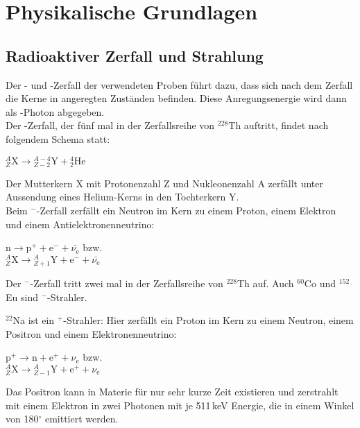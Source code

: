 \section{Physikalische Grundlagen}
\subsection{Radioaktiver Zerfall und Strahlung}

Der \textalpha- und \textbeta-Zerfall der verwendeten Proben führt dazu,
dass sich nach dem Zerfall die Kerne in angeregten Zuständen befinden.
Diese Anregungsenergie wird dann als \textgamma-Photon abgegeben.\\

Der \textalpha-Zerfall, der fünf mal in der Zerfallsreihe von ${}^{228}$Th auftritt,
findet nach folgendem Schema statt:
\begin{center}
${}^{A}_{Z}\text{X} \rightarrow {}^{A-4}_{Z-2}\text{Y} + {}^{4}_{2}\text{He}$
\end{center}
Der Mutterkern X mit Protonenzahl Z und Nukleonenzahl A zerfällt unter Aussendung eines Helium-Kerns
in den Tochterkern Y.\\

Beim \textbeta$^-$-Zerfall zerfällt ein Neutron im Kern zu einem Proton, einem Elektron und einem
Antielektronenneutrino:
\begin{center}
$\text{n} \rightarrow \text{p}^+ + \text{e}^- +\bar{\nu_{\text{e}}}$ bzw.\\[0.15cm]
${}^{A}_{Z}\text{X} \rightarrow {}^{A}_{Z+1}\text{Y} + \text{e}^- + \bar{\nu_{\text{e}}}$
\end{center}

Der \textbeta$^-$-Zerfall tritt zwei mal in der Zerfallsreihe von ${}^{228}$Th auf.
Auch ${}^{60}$Co und ${}^{152}$Eu sind \textbeta$^-$-Strahler.

${}^{22}$Na ist ein \textbeta$^+$-Strahler:
Hier zerfällt ein Proton im Kern zu einem Neutron, einem Positron und einem
Elektronenneutrino:
\begin{center}
$\text{p}^+ \rightarrow \text{n} + \text{e}^+ +\nu_{\text{e}}$ bzw.\\[0.15cm]
${}^{A}_{Z}\text{X} \rightarrow {}^{A}_{Z-1}\text{Y} + \text{e}^+ + \nu_{\text{e}}$
\end{center}

Das Positron kann in Materie für nur sehr kurze Zeit existieren und zerstrahlt mit einem Elektron
in zwei Photonen mit je 511\,keV Energie, die in einem Winkel von 180$^\circ$ emittiert werden.


